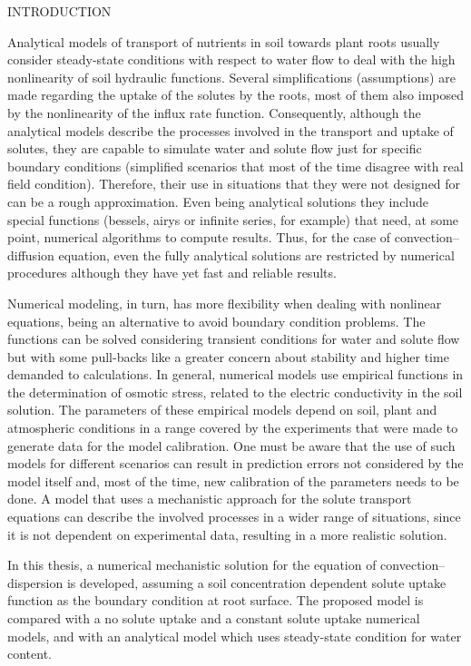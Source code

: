 \cleardoublepage
\chap INTRODUCTION

Analytical models of transport of nutrients in soil towards plant roots usually consider steady-state conditions with respect to water flow to deal with the high nonlinearity of soil hydraulic functions. 
Several simplifications (assumptions) are made regarding the uptake of the solutes by the roots, most of them also imposed by the nonlinearity of the influx rate function. 
Consequently, although the analytical models describe the processes involved in the transport and uptake of solutes, they are capable to simulate water and solute flow just for specific boundary conditions (simplified scenarios that most of the time  disagree with real field condition). Therefore, their use in situations that they were not designed for can be a rough approximation.
Even being analytical solutions they include special functions (bessels, airys or infinite series, for example) that need, at some point, numerical algorithms to compute results.
Thus, for the case of convection--diffusion equation, even the fully analytical solutions are restricted by numerical procedures although they have yet fast and reliable results.

Numerical modeling, in turn, has more flexibility when dealing with nonlinear equations, being an alternative to avoid boundary condition problems. 
The functions can be solved considering transient conditions for water and solute flow but with some pull-backs like a greater concern about stability and higher time demanded to calculations.
In general, numerical models use empirical functions in the determination of osmotic stress, related to the electric conductivity in the soil solution. 
The parameters of these empirical models depend on soil, plant and atmospheric conditions in a range covered by the experiments that were made to generate data for the model calibration. 
One must be aware that the use of such models for different scenarios can result in prediction errors 
not considered by the model itself and, most of the time, new calibration of the parameters needs to be done.
A model that uses a mechanistic approach for the solute transport equations can describe the involved processes in a wider range of situations, since it is not dependent on experimental data, resulting in a more realistic solution.

In this thesis, a numerical mechanistic solution for the equation of convection--dispersion is developed, assuming a soil concentration dependent solute uptake function as the boundary condition at root surface. The proposed model is compared with a no solute uptake and a constant solute uptake numerical models, and with an analytical model which uses steady-state condition for water content. 


